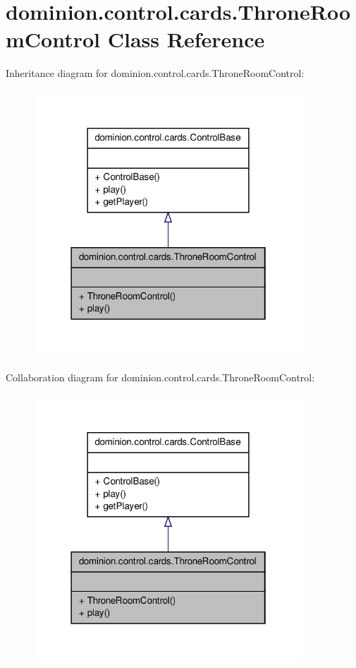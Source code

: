 \hypertarget{classdominion_1_1control_1_1cards_1_1ThroneRoomControl}{\section{dominion.\-control.\-cards.\-Throne\-Room\-Control \-Class \-Reference}
\label{classdominion_1_1control_1_1cards_1_1ThroneRoomControl}
}


\-Inheritance diagram for dominion.\-control.\-cards.\-Throne\-Room\-Control\-:
\nopagebreak
\begin{figure}[H]
\begin{center}
\leavevmode
\includegraphics[width=286pt]{classdominion_1_1control_1_1cards_1_1ThroneRoomControl__inherit__graph}
\end{center}
\end{figure}


\-Collaboration diagram for dominion.\-control.\-cards.\-Throne\-Room\-Control\-:
\nopagebreak
\begin{figure}[H]
\begin{center}
\leavevmode
\includegraphics[width=286pt]{classdominion_1_1control_1_1cards_1_1ThroneRoomControl__coll__graph}
\end{center}
\end{figure}
